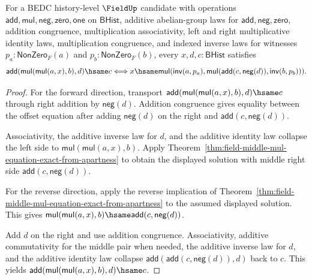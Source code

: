 \begin{theorem}
\label{thm:field-affine-two-sided-equation-exact-from-apartness}
\label{thm:field-two-sided-affine-equation-exact-from-apartness}
For a BEDC history-level $\FieldUp$ candidate with operations
$\mathsf{add},\mathsf{mul},\mathsf{neg},\mathsf{zero},\mathsf{one}$ on
$\mathsf{BHist}$, additive abelian-group laws for
$\mathsf{add},\mathsf{neg},\mathsf{zero}$, addition congruence,
multiplication associativity, left and right multiplicative identity laws,
multiplication congruence, and indexed inverse laws for witnesses
$p_a:\mathsf{NonZero}_F(a)$ and $p_b:\mathsf{NonZero}_F(b)$, every
$x,d,c:\mathsf{BHist}$ satisfies
$$
\mathsf{add}(\mathsf{mul}(\mathsf{mul}(a,x),b),d)\hsame c
\Longleftrightarrow
x\hsame
\mathsf{mul}(\mathsf{inv}(a,p_a),
\mathsf{mul}(\mathsf{add}(c,\mathsf{neg}(d)),\mathsf{inv}(b,p_b))).
$$
\end{theorem}
\begin{proof}
For the forward direction, transport
$\mathsf{add}(\mathsf{mul}(\mathsf{mul}(a,x),b),d)\hsame c$ through right
addition by $\mathsf{neg}(d)$. Addition congruence gives equality between the
offset equation after adding $\mathsf{neg}(d)$ on the right and
$\mathsf{add}(c,\mathsf{neg}(d))$.

Associativity, the additive inverse law for $d$, and the additive identity law
collapse the left side to $\mathsf{mul}(\mathsf{mul}(a,x),b)$. Apply
Theorem~\ref{thm:field-middle-mul-equation-exact-from-apartness} to obtain the
displayed solution with middle right side
$\mathsf{add}(c,\mathsf{neg}(d))$.

For the reverse direction, apply the reverse implication of
Theorem~\ref{thm:field-middle-mul-equation-exact-from-apartness} to the assumed
displayed solution. This gives
$\mathsf{mul}(\mathsf{mul}(a,x),b)\hsame\mathsf{add}(c,\mathsf{neg}(d))$.

Add $d$ on the right and use addition congruence. Associativity, additive
commutativity for the middle pair when needed, the additive inverse law for
$d$, and the additive identity law collapse
$\mathsf{add}(\mathsf{add}(c,\mathsf{neg}(d)),d)$ back to $c$. This yields
$\mathsf{add}(\mathsf{mul}(\mathsf{mul}(a,x),b),d)\hsame c$.
\end{proof}

